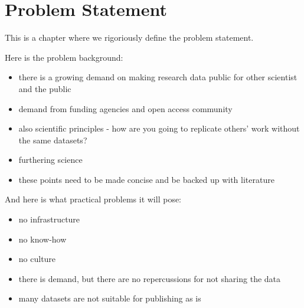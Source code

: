 \chapter{Problem Statement}
\label{chapter:problem}

This is a chapter where we rigoriously define the problem statement.

Here is the problem background:

\begin{itemize}
    \item there is a growing demand on making research data public for other
          scientist and the public
    \item demand from funding agencies and open access community
    \item also scientific principles - how are you going to replicate others'
          work without the same datasets?
    \item furthering science
    \item these points need to be made concise and be backed up with literature
\end{itemize}

And here is what practical problems it will pose:

\begin{itemize}
    \item no infrastructure
    \item no know-how
    \item no culture
    \item there is demand, but there are no repercussions for not sharing the
          data
    \item many datasets are not suitable for publishing as is
\end{itemize}
